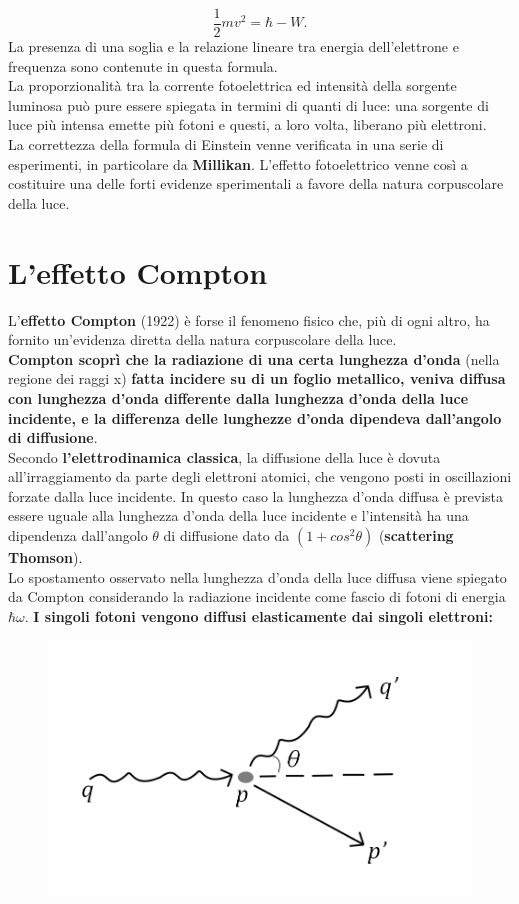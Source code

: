 \begin{equation}
\frac{1}{2}m v^2= \hbar - W.
\end{equation}
La presenza di una soglia e la relazione lineare tra energia dell'elettrone e frequenza sono contenute in questa formula.\\ La proporzionalità tra la corrente fotoelettrica ed intensità della sorgente luminosa può pure essere spiegata in termini di quanti di luce: una sorgente di luce più intensa emette più fotoni e questi, a loro volta, liberano più elettroni.\\ La correttezza della formula di Einstein venne verificata in una serie di esperimenti, in particolare da \textbf{Millikan}. L'effetto fotoelettrico venne così a costituire una delle forti evidenze sperimentali a favore della natura corpuscolare della luce.
\section{L'effetto Compton}
L'\textbf{effetto Compton} (1922) è forse il fenomeno fisico che, più di ogni altro, ha fornito un'evidenza diretta della natura corpuscolare della luce.\\ \textbf{Compton scoprì che la radiazione di una certa lunghezza d'onda} (nella regione dei raggi x) \textbf{fatta incidere su di un foglio metallico, veniva diffusa con lunghezza d'onda differente dalla lunghezza d'onda della luce incidente, e la differenza delle lunghezze d'onda dipendeva dall'angolo di diffusione}.\\
Secondo \textbf{l'elettrodinamica classica}, la diffusione della luce è dovuta all'irraggiamento da parte degli elettroni atomici, che vengono posti in oscillazioni forzate dalla luce incidente. In questo caso la lunghezza d'onda diffusa è prevista essere uguale alla lunghezza d'onda della luce incidente e l'intensità ha una dipendenza dall'angolo $\theta$ di diffusione dato da $(1+cos^2 \theta)$ (\textbf{scattering Thomson}).\\
Lo spostamento osservato nella lunghezza d'onda della luce diffusa viene spiegato da Compton considerando la radiazione incidente come fascio di fotoni di energia $\hbar \omega$. \textbf{I singoli fotoni vengono diffusi elasticamente dai singoli elettroni:}\\
\begin{figure}[!htbp]
\begin{center}
\includegraphics[width=.6\textwidth]{immagini/cap_1/fig_1_3.png}
\end{center}
\end{figure}\\
